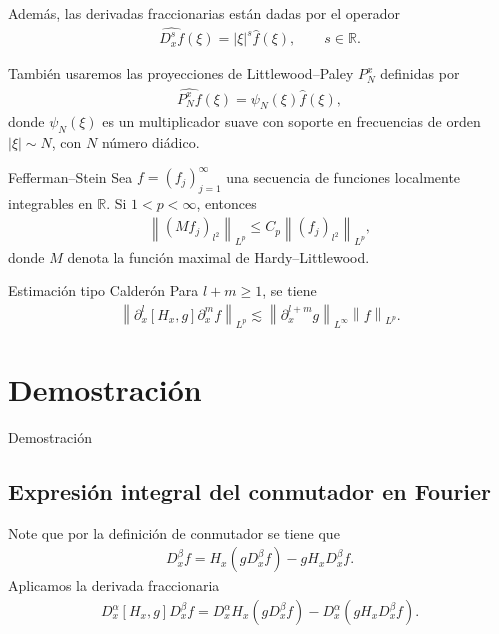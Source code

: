 \documentclass[9pt]{beamer}
\providecommand{\norm}[1]{\left\|#1\right\|}
\begin{document}
\begin{frame}{}
  Además, las derivadas fraccionarias están dadas por el operador
  \begin{align*}
    \hat{D_x^s f}(\xi) = |\xi|^s \hat{f}(\xi), \qquad s \in \mathbb{R}. 
  \end{align*}
\end{frame}

\begin{frame}{}
  También usaremos las proyecciones de Littlewood–Paley $P^x_N$ definidas por
  \begin{align*}
    \hat{P^x_N f}(\xi) = \psi_N(\xi) \hat{f}(\xi), 
  \end{align*}
  donde $\psi_N(\xi)$ es un multiplicador suave con soporte en frecuencias de orden $|\xi| \sim N$, con $N$ número diádico.
\end{frame}

\begin{frame}{}
  \begin{block}{Fefferman–Stein}
    Sea $f = (f_j)_{j=1}^{\infty}$ una secuencia de funciones localmente integrables en $\mathbb{R}$. Si $1 < p < \infty$, entonces
    \begin{align*}
      \norm{(Mf_j)_{l^2}}_{L^p} \leq C_p \norm{(f_j)_{l^2}}_{L^p}, 
    \end{align*}
    donde $M$ denota la función maximal de Hardy–Littlewood.
  \end{block}
\end{frame}

\begin{frame}
  \begin{block}{Estimación tipo Calderón}
    Para $l + m \geq 1$, se tiene
    \begin{align*}
      \norm{\partial_x^l [H_x, g] \partial_x^m f}_{L^p} \lesssim \norm{\partial_x^{l + m} g}_{L^\infty} \norm{f}_{L^p}. 
    \end{align*}
  \end{block}
\end{frame}

\section{Demostración}

\begin{frame}{Demostración}
  \subsection*{Expresión integral del conmutador en Fourier}
  Note que por la definición de conmutador se tiene que
  \begin{align*}
    [H_x, g] D_x^\beta f = H_x(g D_x^\beta f) - g H_x D_x^\beta f. 
  \end{align*}
  Aplicamos la derivada fraccionaria
  \begin{align*}
    D_x^\alpha [H_x, g] D_x^\beta f = D_x^\alpha H_x(g D_x^\beta f) - D_x^\alpha (g H_x D_x^\beta f). 
  \end{align*}
\end{frame}
\end{document}

